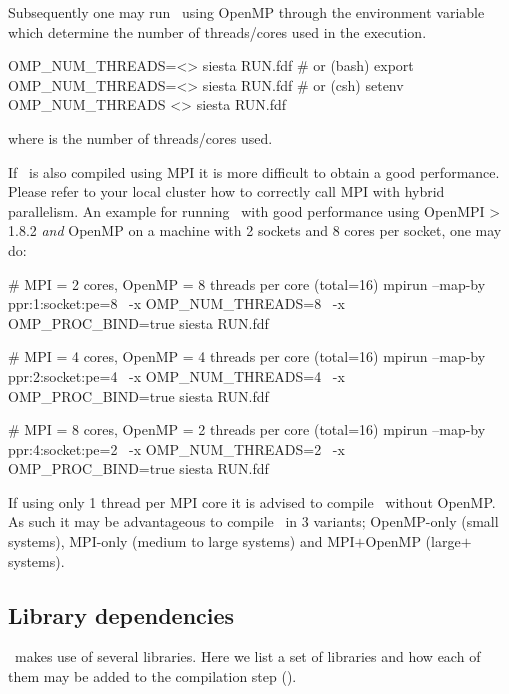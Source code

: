 Subsequently one may run \siesta\ using OpenMP through the environment
variable  which determine the number of
threads/cores used in the execution.
\begin{shellexample}
  OMP_NUM_THREADS=<> siesta RUN.fdf
  # or (bash)
  export OMP_NUM_THREADS=<>
  siesta RUN.fdf
  # or (csh)
  setenv OMP_NUM_THREADS <>
  siesta RUN.fdf
\end{shellexample}
where \shell{<>} is the number of threads/cores used.

If \siesta\ is also compiled using MPI it is more difficult to obtain
a good performance. Please refer to your local cluster how to
correctly call MPI with hybrid parallelism.
%
An example for running \siesta\ with good performance using OpenMPI >
1.8.2 \emph{and} OpenMP on a machine with 2 sockets and 8 cores per
socket, one may do:
\begin{shellexample}
  # MPI = 2 cores, OpenMP = 8 threads per core (total=16)
  mpirun --map-by ppr:1:socket:pe=8 \
     -x OMP_NUM_THREADS=8 \
     -x OMP_PROC_BIND=true siesta RUN.fdf

  # MPI = 4 cores, OpenMP = 4 threads per core (total=16)
  mpirun --map-by ppr:2:socket:pe=4 \
     -x OMP_NUM_THREADS=4 \
     -x OMP_PROC_BIND=true siesta RUN.fdf

  # MPI = 8 cores, OpenMP = 2 threads per core (total=16)
  mpirun --map-by ppr:4:socket:pe=2 \
     -x OMP_NUM_THREADS=2 \
     -x OMP_PROC_BIND=true siesta RUN.fdf
\end{shellexample}
If using only 1 thread per MPI core it is advised to compile \siesta\
without OpenMP. As such it may be advantageous to compile \siesta\ in
3 variants; OpenMP-only (small systems), MPI-only (medium to large
systems) and MPI$+$OpenMP (large$+$ systems).


\subsection{Library dependencies}
\label{sec:libs}
\index{compile!libraries}

\siesta\ makes use of several libraries. Here we list a set of
libraries and how each of them may be added to the compilation step
().

